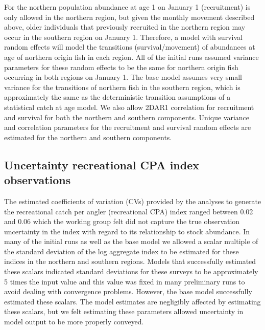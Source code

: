 \documentclass[
]{article}
\begin{document}
For the northern population abundance at age 1 on January 1
(recruitment) is only allowed in the northern region, but given the
monthly movement described above, older individuals that previously
recruited in the northern region may occur in the southern region on
January 1. Therefore, a model with survival random effects will model
the transitions (survival/movement) of abundances at age of northern
origin fish in each region. All of the initial runs assumed variance
parameters for these random effects to be the same for northern origin
fish occurring in both regions on January 1. The base model assumes very
small variance for the transitions of northern fish in the southern
region, which is approximately the same as the deterministic transition
assumptions of a statistical catch at age model. We also allow 2DAR1
correlation for recruitment and survival for both the northern and
southern components. Unique variance and correlation parameters for the
recruitment and survival random effects are estimated for the northern
and southern components.

\hypertarget{uncertainty-recreational-cpa-index-observations}{%
\subsection*{Uncertainty recreational CPA index
observations}\label{uncertainty-recreational-cpa-index-observations}}

The estimated coefficients of variation (CVs) provided by the analyses
to generate the recreational catch per angler (recreational CPA) index
ranged between 0.02 and 0.06 which the working group felt did not
capture the true observation uncertainty in the index with regard to its
relationship to stock abundance. In many of the initial runs as well as
the base model we allowed a scalar multiple of the standard deviation of
the log aggregate index to be estimated for these indices in the
northern and southern regions. Models that successfully estimated these
scalars indicated standard deviations for these surveys to be
approximately 5 times the input value and this value was fixed in many
preliminary runs to avoid dealing with convergence problems. However,
the base model successfully estimated these scalars. The model estimates
are negligibly affected by estimating these scalars, but we felt
estimating these parameters allowed uncertainty in model output to be
more properly conveyed.
\end{document}
